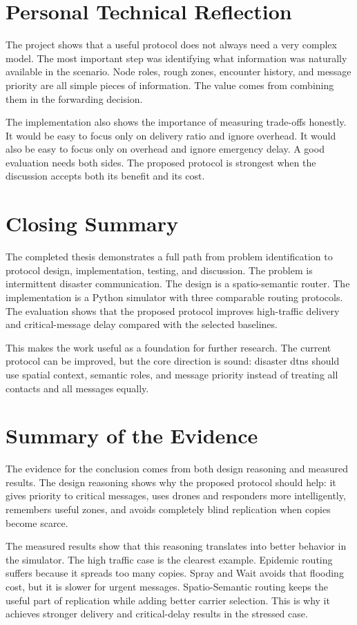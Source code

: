 \section{Personal Technical Reflection}
The project shows that a useful protocol does not always need a very complex model. The most important step was identifying what information was naturally available in the scenario. Node roles, rough zones, encounter history, and message priority are all simple pieces of information. The value comes from combining them in the forwarding decision.

The implementation also shows the importance of measuring trade-offs honestly. It would be easy to focus only on delivery ratio and ignore overhead. It would also be easy to focus only on overhead and ignore emergency delay. A good evaluation needs both sides. The proposed protocol is strongest when the discussion accepts both its benefit and its cost.

\section{Closing Summary}
The completed thesis demonstrates a full path from problem identification to protocol design, implementation, testing, and discussion. The problem is intermittent disaster communication. The design is a spatio-semantic router. The implementation is a Python simulator with three comparable routing protocols. The evaluation shows that the proposed protocol improves high-traffic delivery and critical-message delay compared with the selected baselines.

This makes the work useful as a foundation for further research. The current protocol can be improved, but the core direction is sound: disaster \acp{dtn} should use spatial context, semantic roles, and message priority instead of treating all contacts and all messages equally.

\section{Summary of the Evidence}
The evidence for the conclusion comes from both design reasoning and measured results. The design reasoning shows why the proposed protocol should help: it gives priority to critical messages, uses drones and responders more intelligently, remembers useful zones, and avoids completely blind replication when copies become scarce.

The measured results show that this reasoning translates into better behavior in the simulator. The high traffic case is the clearest example. Epidemic routing suffers because it spreads too many copies. Spray and Wait avoids that flooding cost, but it is slower for urgent messages. Spatio-Semantic routing keeps the useful part of replication while adding better carrier selection. This is why it achieves stronger delivery and critical-delay results in the stressed case.

